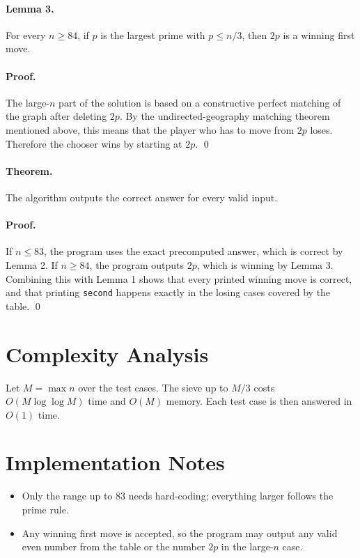 \documentclass[11pt]{article}
\begin{document}
\paragraph{Lemma 3.}
For every $n \ge 84$, if $p$ is the largest prime with $p \le n/3$, then $2p$ is a winning first move.

\paragraph{Proof.}
The large-$n$ part of the solution is based on a constructive perfect matching of the graph after deleting
$2p$. By the undirected-geography matching theorem mentioned above, this means that the player who
has to move from $2p$ loses. Therefore the chooser wins by starting at $2p$. \qed

\paragraph{Theorem.}
The algorithm outputs the correct answer for every valid input.

\paragraph{Proof.}
If $n \le 83$, the program uses the exact precomputed answer, which is correct by Lemma 2. If
$n \ge 84$, the program outputs $2p$, which is winning by Lemma 3. Combining this with Lemma 1
shows that every printed winning move is correct, and that printing \texttt{second} happens exactly in
the losing cases covered by the table. \qed

\section*{Complexity Analysis}

Let $M=\max n$ over the test cases. The sieve up to $M/3$ costs $O(M \log\log M)$ time and $O(M)$
memory. Each test case is then answered in $O(1)$ time.

\section*{Implementation Notes}

\begin{itemize}[leftmargin=*]
    \item Only the range up to $83$ needs hard-coding; everything larger follows the prime rule.
    \item Any winning first move is accepted, so the program may output any valid even number from the
    table or the number $2p$ in the large-$n$ case.
\end{itemize}
\end{document}
